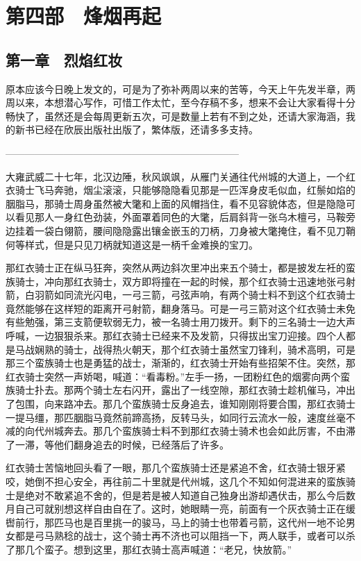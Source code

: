 \part{第四部　烽烟再起}

\chapter{第一章　烈焰红妆}

原本应该今日晚上发文的，可是为了弥补两周以来的苦等，今天上午先发半章，两周以来，本想潜心写作，可惜工作太忙，至今存稿不多，想来不会让大家看得十分畅快了，虽然还是会每周更新五次，可是数量上若有不到之处，还请大家海涵，我的新书已经在欣辰出版社出版了，繁体版，还请多多支持。

————————————————————————

大雍武威二十七年，北汉边陲，秋风飒飒，从雁门关通往代州城的大道上，一个红衣骑士飞马奔驰，烟尘滚滚，只能够隐隐看见那是一匹浑身皮毛似血，红鬃如焰的胭脂马，那骑士周身虽然被大氅和上面的风帽挡住，看不见容貌体态，但是隐隐可以看见那人一身红色劲装，外面罩着同色的大氅，后肩斜背一张乌木檀弓，马鞍旁边挂着一袋白翎箭，腰间隐隐露出镶金嵌玉的刀柄，刀身被大氅掩住，看不见刀鞘何等样式，但是只见刀柄就知道这是一柄千金难换的宝刀。

那红衣骑士正在纵马狂奔，突然从两边斜次里冲出来五个骑士，都是披发左衽的蛮族骑士，冲向那红衣骑士，双方即将撞在一起的时候，那个红衣骑士迅速地张弓射箭，白羽箭如同流光闪电，一弓三箭，弓弦声响，有两个骑士料不到这个红衣骑士竟然能够在这样短的距离开弓射箭，翻身落马。可是一弓三箭对这个红衣骑士未免有些勉强，第三支箭便软弱无力，被一名骑士用刀拨开。剩下的三名骑士一边大声呼喊，一边狠狠杀来。那红衣骑士已经来不及发箭，只得拔出宝刀迎接。四个人都是马战娴熟的骑士，战得热火朝天，那个红衣骑士虽然宝刀锋利，骑术高明，可是那三个蛮族骑士也是勇猛的战士，渐渐的，红衣骑士开始有些招架不住。突然，那红衣骑士突然一声娇喝，喊道：“看毒粉。”左手一扬，一团粉红色的烟雾向两个蛮族骑士扑去。那两个骑士左右闪开，露出了一线空隙，那红衣骑士趁机催马，冲出了包围，向来路冲去。那几个蛮族骑士反身追去，谁知刚刚将要合围，那红衣骑士一提马缰，那匹胭脂马竟然前蹄高扬，反转马头，如同行云流水一般，速度丝毫不减的向代州城奔去。那几个蛮族骑士料不到那红衣骑士骑术也会如此厉害，不由滞了一滞，等他们翻身追去的时候，已经落后了许多。

红衣骑士苦恼地回头看了一眼，那几个蛮族骑士还是紧追不舍，红衣骑士银牙紧咬，她倒不担心安全，再往前二十里就是代州城，这几个不知如何混进来的蛮族骑士是绝对不敢紧追不舍的，但是若是被人知道自己独身出游却遇伏击，那么今后数月自己可就别想这样自由自在了。这时，她眼睛一亮，前面有一个灰衣骑士正在缓辔前行，那匹马也是百里挑一的骏马，马上的骑士也带着弓箭，这代州一地不论男女都是弓马熟稔的战士，这个骑士再不济也可以阻挡一下，两人联手，或者可以杀了那几个蛮子。想到这里，那红衣骑士高声喊道：“老兄，快放箭。”

